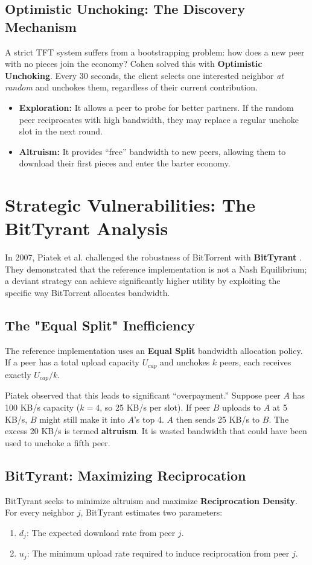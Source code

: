 \documentclass[12pt]{article}
\begin{document}
\subsection{Optimistic Unchoking: The Discovery Mechanism}
A strict TFT system suffers from a bootstrapping problem: how does a new peer with no pieces join the economy? Cohen solved this with \textbf{Optimistic Unchoking}. Every 30 seconds, the client selects one interested neighbor \textit{at random} and unchokes them, regardless of their current contribution.
\begin{itemize}
    \item \textbf{Exploration:} It allows a peer to probe for better partners. If the random peer reciprocates with high bandwidth, they may replace a regular unchoke slot in the next round.
    \item \textbf{Altruism:} It provides ``free'' bandwidth to new peers, allowing them to download their first pieces and enter the barter economy.
\end{itemize}

\section{Strategic Vulnerabilities: The BitTyrant Analysis}

In 2007, Piatek et al. challenged the robustness of BitTorrent with \textbf{BitTyrant} \cite{Piatek2007}. They demonstrated that the reference implementation is not a Nash Equilibrium; a deviant strategy can achieve significantly higher utility by exploiting the specific way BitTorrent allocates bandwidth.

\subsection{The "Equal Split" Inefficiency}
The reference implementation uses an \textbf{Equal Split} bandwidth allocation policy. If a peer has a total upload capacity $U_{cap}$ and unchokes $k$ peers, each receives exactly $U_{cap} / k$.

Piatek observed that this leads to significant ``overpayment.'' Suppose peer $A$ has 100 KB/s capacity ($k=4$, so 25 KB/s per slot). If peer $B$ uploads to $A$ at 5 KB/s, $B$ might still make it into $A$'s top 4. $A$ then sends 25 KB/s to $B$. The excess 20 KB/s is termed \textbf{altruism}. It is wasted bandwidth that could have been used to unchoke a fifth peer.

\subsection{BitTyrant: Maximizing Reciprocation}
BitTyrant seeks to minimize altruism and maximize \textbf{Reciprocation Density}. For every neighbor $j$, BitTyrant estimates two parameters:
\begin{enumerate}
    \item $d_j$: The expected download rate from peer $j$.
    \item $u_j$: The minimum upload rate required to induce reciprocation from peer $j$.
\end{enumerate}
\end{document}
